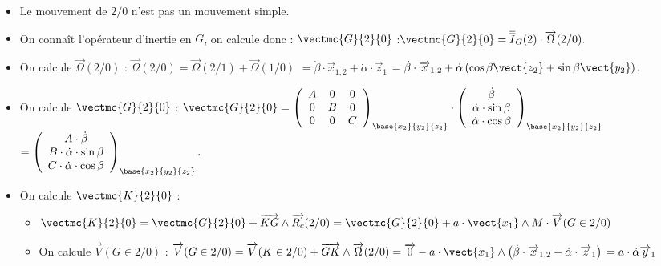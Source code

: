 \begin{multicols}{2}
 
\ifprof
\begin{corrige}
\begin{itemize}
\item Le mouvement de $2/0$ n'est pas un mouvement simple. 
\item On connaît l'opérateur d'inertie en $G$, on calcule donc : $\vectmc{G}{2}{0}$ :$
\vectmc{G}{2}{0}=\overline{\overline{I}}_G(2)\cdot \overrightarrow{\Omega}(2/0).$

\item On calcule $\overrightarrow{\Omega}(2/0)$ :
$\overrightarrow{\Omega}(2/0)=\overrightarrow{\Omega}(2/1)+\overrightarrow{\Omega}(1/0)$ 
$=\dot{\beta}\cdot \overrightarrow{x}_{1,2}+\dot{\alpha}\cdot \overrightarrow{z}_{1}$
$=\dot{\beta}\cdot \overrightarrow{x}_{1,2}
+\dot{\alpha}\left(\cos\beta\vect{z_2}+\sin\beta\vect{y_{2}}\right)$.

\item On calcule $\vectmc{G}{2}{0}$ : 
$
\vectmc{G}{2}{0}=\left(
\begin{array}{ccc}
A & 0 & 0 \\ 
0 & B & 0 \\ 
0 & 0 & C
\end{array}
\right)_{\base{{x}_2}{{y}_2}{{z}_2}} \cdot 
\left(
\begin{array}{c}
\dot{\beta}\\
\dot{\alpha}\cdot \sin\beta\\
\dot{\alpha}\cdot \cos\beta\\
\end{array}
\right)_{\base{{x}_2}{{y}_2}{{z}_2}}$
$=\left(
\begin{array}{c}
A\cdot \dot{\beta}\\
B\cdot \dot{\alpha}\cdot \sin\beta\\
C\cdot \dot{\alpha}\cdot \cos\beta\\
\end{array}
\right)_{\base{{x}_2}{{y}_2}{{z}_2}}.$

\item On calcule $\vectmc{K}{2}{0}$ : 
\begin{itemize}
\item $\vectmc{K}{2}{0}=\vectmc{G}{2}{0}+\overrightarrow{KG}\wedge \overrightarrow{R_c}(2/0)
=\vectmc{G}{2}{0}+a\cdot \vect{x_{1}}\wedge M\cdot \overrightarrow{V}(G\in 2/0)$
\item On calcule $\overrightarrow{V}(G\in 2/0)$ : 
$\overrightarrow{V}(G\in 2/0)=\overrightarrow{V}(K\in 2/0)+\overrightarrow{GK}\wedge \overrightarrow{\Omega}(2/0)=
\overrightarrow{0}-a\cdot \vect{x_{1}}\wedge \left(\dot{\beta}\cdot \overrightarrow{x}_{1,2}+\dot{\alpha}\cdot \overrightarrow{z}_{1}\right)\\
=a\cdot \dot{\alpha}\overrightarrow{y}_{1} $


\end{itemize}
\end{itemize}
\end{corrige}
\end{multicols}
